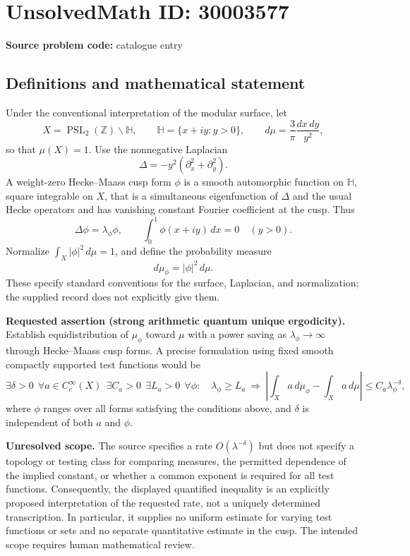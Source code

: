 \documentclass[11pt]{article}
\newcommand{\Z}{\mathbb{Z}}
\begin{document}
\section*{UnsolvedMath ID: 30003577}
\textbf{Source problem code:} catalogue entry
\subsection{Definitions and mathematical statement}
Under the conventional interpretation of the modular surface, let
\[
X=\operatorname{PSL}_2(\Z)\backslash\mathbb H,
\qquad \mathbb H=\{x+iy:y>0\},
\qquad d\mu=\frac{3}{\pi}\frac{dx\,dy}{y^2},
\]
so that \(\mu(X)=1\). Use the nonnegative Laplacian
\[
\Delta=-y^2(\partial_x^2+\partial_y^2).
\]
A weight-zero Hecke--Maass cusp form \(\phi\) is a smooth automorphic function on \(\mathbb H\), square integrable on \(X\), that is a simultaneous eigenfunction of \(\Delta\) and the usual Hecke operators and has vanishing constant Fourier coefficient at the cusp. Thus
\[
\Delta\phi=\lambda_\phi\phi,
\qquad
\int_0^1\phi(x+iy)\,dx=0\quad(y>0).
\]
Normalize \(\int_X|\phi|^2\,d\mu=1\), and define the probability measure
\[
d\mu_\phi=|\phi|^2\,d\mu.
\]
These specify standard conventions for the surface, Laplacian, and normalization; the supplied record does not explicitly give them.

\textbf{Requested assertion (strong arithmetic quantum unique ergodicity).} Establish equidistribution of \(\mu_\phi\) toward \(\mu\) with a power saving as \(\lambda_\phi\to\infty\) through Hecke--Maass cusp forms. A precise formulation using fixed smooth compactly supported test functions would be
\[
\exists\delta>0\ \ \forall a\in C_c^\infty(X)\ \ \exists C_a>0\ \ \exists L_a>0\ \ \forall\phi:
\quad
\lambda_\phi\ge L_a
\ \Longrightarrow\ 
\left|\int_X a\,d\mu_\phi-\int_X a\,d\mu\right|
\le C_a\lambda_\phi^{-\delta},
\]
where \(\phi\) ranges over all forms satisfying the conditions above, and \(\delta\) is independent of both \(a\) and \(\phi\).

\textbf{Unresolved scope.} The source specifies a rate \(O(\lambda^{-\delta})\) but does not specify a topology or testing class for comparing measures, the permitted dependence of the implied constant, or whether a common exponent is required for all test functions. Consequently, the displayed quantified inequality is an explicitly proposed interpretation of the requested rate, not a uniquely determined transcription. In particular, it supplies no uniform estimate for varying test functions or sets and no separate quantitative estimate in the cusp. The intended scope requires human mathematical review.
\end{document}
